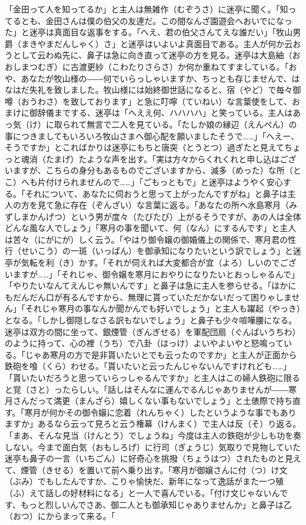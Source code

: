\documentclass{book}
\begin{document}
「金田って人を知ってるか」と主人は無雑作（むぞうさ）に迷亭に聞く。「知ってるとも、金田さんは僕の伯父の友達だ。この間なんざ園遊会へおいでになった」と迷亭は真面目な返事をする。「へえ、君の伯父さんてえな誰だい」「牧山男爵（まきやまだんしゃく）さ」と迷亭はいよいよ真面目である。主人が何か云おうとして云わぬ先に、鼻子は急に向き直って迷亭の方を見る。迷亭は大島紬（おおしまつむぎ）に古渡更紗（こわたりさらさ）か何か重ねてすましている。「おや、あなたが牧山様の――何でいらっしゃいますか、ちっとも存じませんで、はなはだ失礼を致しました。牧山様には始終御世話になると、宿（やど）で毎々御噂（おうわさ）を致しております」と急に叮嚀（ていねい）な言葉使をして、おまけに御辞儀までする、迷亭は「へええ何、ハハハハ」と笑っている。主人はあっ気（け）に取られて無言で二人を見ている。「たしか娘の縁辺（えんぺん）の事につきましてもいろいろ牧山さまへ御心配を願いましたそうで\ldots{}\ldots{}」「へえー、そうですか」とこればかりは迷亭にもちと唐突（とうとつ）過ぎたと見えてちょっと魂消（たまげ）たような声を出す。「実は方々からくれくれと申し込はございますが、こちらの身分もあるものでございますから、滅多（めった）な所（とこ）へも片付けられませんので\ldots{}\ldots{}」「ごもっともで」と迷亭はようやく安心する。「それについて、あなたに伺おうと思って上がったんですがね」と鼻子は主人の方を見て急に存在（ぞんざい）な言葉に返る。「あなたの所へ水島寒月（みずしまかんげつ）という男が度々（たびたび）上がるそうですが、あの人は全体どんな風な人でしょう」「寒月の事を聞いて、何（なん）にするんです」と主人は苦々（にがにが）しく云う。「やはり御令嬢の御婚儀上の関係で、寒月君の性行（せいこう）の一斑（いっぱん）を御承知になりたいという訳でしょう」と迷亭が気転を利（き）かす。「それが伺えれば大変都合が宜（よろ）しいのでございますが\ldots{}\ldots{}」「それじゃ、御令嬢を寒月におやりになりたいとおっしゃるんで」「やりたいなんてえんじゃ無いんです」と鼻子は急に主人を参らせる。「ほかにもだんだん口が有るんですから、無理に貰っていただかないだって困りゃしません」「それじゃ寒月の事なんか聞かんでも好いでしょう」と主人も躍起（やっき）となる。「しかし御隠しなさる訳もないでしょう」と鼻子も少々喧嘩腰になる。迷亭は双方の間に坐って、銀煙管（ぎんぎせる）を軍配団扇（ぐんばいうちわ）のように持って、心の裡（うち）で八卦（はっけ）よいやよいやと怒鳴っている。「じゃあ寒月の方で是非貰いたいとでも云ったのですか」と主人が正面から鉄砲を喰（くら）わせる。「貰いたいと云ったんじゃないんですけれども\ldots{}\ldots{}」「貰いたいだろうと思っていらっしゃるんですか」と主人はこの婦人鉄砲に限ると覚（さと）ったらしい。「話しはそんなに運んでるんじゃありませんが――寒月さんだって満更（まんざら）嬉しくない事もないでしょう」と土俵際で持ち直す。「寒月が何かその御令嬢に恋着（れんちゃく）したというような事でもありますか」あるなら云って見ろと云う権幕（けんまく）で主人は反（そ）り返る。「まあ、そんな見当（けんとう）でしょうね」今度は主人の鉄砲が少しも功を奏しない。今まで面白気（おもしろげ）に行司（ぎょうじ）気取りで見物していた迷亭も鼻子の一言（いちごん）に好奇心を挑撥（ちょうはつ）されたものと見えて、煙管（きせる）を置いて前へ乗り出す。「寒月が御嬢さんに付（つ）け文（ぶみ）でもしたんですか、こりゃ愉快だ、新年になって逸話がまた一つ殖（ふ）えて話しの好材料になる」と一人で喜んでいる。「付け文じゃないんです、もっと烈しいんでさあ、御二人とも御承知じゃありませんか」と鼻子は乙（おつ）にからまって来る。「
\end{document}
